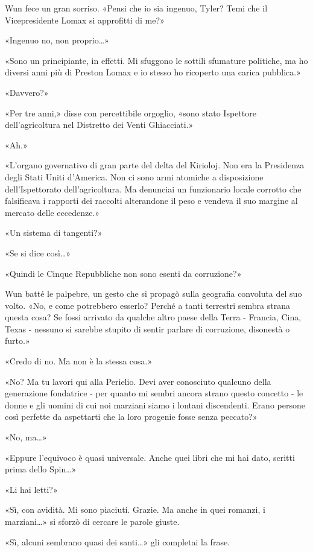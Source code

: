 Wun fece un gran sorriso. «Pensi che io sia ingenuo, Tyler? Temi che il
Vicepresidente Lomax si approfitti di me?»

«Ingenuo no, non proprio\ldots»

«Sono un principiante, in effetti. Mi sfuggono le sottili sfumature
politiche, ma ho diversi anni più di Preston Lomax e io stesso ho
ricoperto una carica pubblica.»

«Davvero?»

«Per tre anni,» disse con percettibile orgoglio, «sono stato Ispettore
dell'agricoltura nel Distretto dei Venti Ghiacciati.»

«Ah.»

«L'organo governativo di gran parte del delta del Kirioloj. Non era la
Presidenza degli Stati Uniti d'America. Non ci sono armi atomiche a
disposizione dell'Ispettorato dell'agricoltura. Ma denunciai un
funzionario locale corrotto che falsificava i rapporti dei raccolti
alterandone il peso e vendeva il suo margine al mercato delle
eccedenze.»

«Un sistema di tangenti?»

«Se si dice così\ldots»

«Quindi le Cinque Repubbliche non sono esenti da corruzione?»

Wun batté le palpebre, un gesto che si propagò sulla geografia convoluta
del suo volto. «No, e come potrebbero esserlo? Perché a tanti terrestri
sembra strana questa cosa? Se fossi arrivato da qualche altro paese
della Terra - Francia, Cina, Texas - nessuno si sarebbe stupito di
sentir parlare di corruzione, disonestà o furto.»

«Credo di no. Ma non è la stessa cosa.»

«No? Ma tu lavori qui alla Perielio. Devi aver conosciuto qualcuno della
generazione fondatrice - per quanto mi sembri ancora strano questo
concetto - le donne e gli uomini di cui noi marziani siamo i lontani
discendenti. Erano persone così perfette da aspettarti che la loro
progenie fosse senza peccato?»

«No, ma\ldots»

«Eppure l'equivoco è quasi universale. Anche quei libri che mi hai dato,
scritti prima dello Spin\ldots»

«Li hai letti?»

«Sì, con avidità. Mi sono piaciuti. Grazie. Ma anche in quei romanzi, i
marziani\ldots» si sforzò di cercare le parole giuste.

«Sì, alcuni sembrano quasi dei santi\ldots» gli completai la frase.

